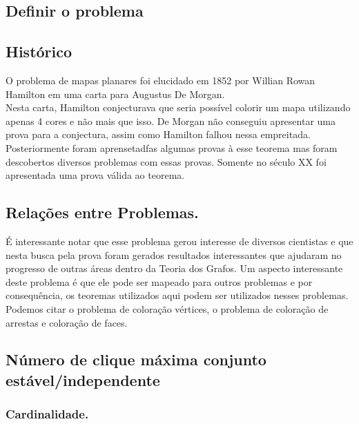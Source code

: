 \documentclass[12pt]{article}
\begin{document}
\subsection{Definir o problema}

\subsection{Histórico}


O problema de mapas planares foi elucidado em 1852 por Willian Rowan Hamilton em uma carta para Augustus De Morgan.\\
Nesta carta, Hamilton conjecturava que seria possível colorir um mapa utilizando apenas 4 cores e não mais que isso. De Morgan não conseguiu apresentar uma prova para a conjectura, assim como Hamilton falhou nessa empreitada. Posteriormente foram aprensetadfas algumas provas à esse teorema mas foram descobertos diversos problemas com essas provas. Somente no século XX foi apresentada uma prova válida ao teorema.\\


\subsection{Relações entre Problemas.}

É interessante notar que esse problema gerou interesse de diversos cientistas e que nesta busca pela prova foram gerados resultados interessantes que ajudaram no progresso de outras áreas dentro da Teoria dos Grafos. Um aspecto interessante deste problema é que ele pode ser mapeado para outros problemas e por consequência, os teoremas utilizados aqui podem ser utilizados nesses problemas. Podemos citar o problema de coloração vértices, o problema de coloração de arrestas e coloração de faces.

\subsection{Número de clique máxima conjunto estável/independente}

\subsubsection{Cardinalidade.}
\end{document}
